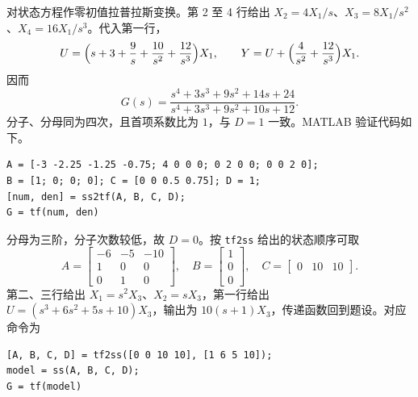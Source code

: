 

\sol 对状态方程作零初值拉普拉斯变换。第 2 至 4 行给出
$X_2=4X_1/s$、$X_3=8X_1/s^2$、$X_4=16X_1/s^3$。代入第一行，
\[
    U=\Bigl(s+3+\frac9s+\frac{10}{s^2}+\frac{12}{s^3}\Bigr)X_1,\qquad
    Y=U+\Bigl(\frac4{s^2}+\frac{12}{s^3}\Bigr)X_1 .
\]
因而
\[
    G(s)=\frac{s^4+3s^3+9s^2+14s+24}{s^4+3s^3+9s^2+10s+12}.
\]
分子、分母同为四次，且首项系数比为 $1$，与 $D=1$ 一致。MATLAB 验证代码如下。
\begin{verbatim}
A = [-3 -2.25 -1.25 -0.75; 4 0 0 0; 0 2 0 0; 0 0 2 0];
B = [1; 0; 0; 0]; C = [0 0 0.5 0.75]; D = 1;
[num, den] = ss2tf(A, B, C, D);
G = tf(num, den)
\end{verbatim}



\sol 分母为三阶，分子次数较低，故 $D=0$。按 \texttt{tf2ss} 给出的状态顺序可取
\[
    A=\begin{bmatrix}-6&-5&-10\\1&0&0\\0&1&0\end{bmatrix},\quad
    B=\begin{bmatrix}1\\0\\0\end{bmatrix},\quad
    C=\begin{bmatrix}0&10&10\end{bmatrix}.
\]
第二、三行给出 $X_1=s^2X_3$、$X_2=sX_3$，第一行给出
$U=(s^3+6s^2+5s+10)X_3$，输出为 $10(s+1)X_3$，传递函数回到题设。对应命令为
\begin{verbatim}
[A, B, C, D] = tf2ss([0 0 10 10], [1 6 5 10]);
model = ss(A, B, C, D);
G = tf(model)
\end{verbatim}

